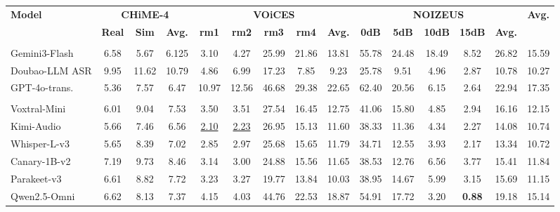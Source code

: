 \documentclass{llmxive}
\providecommand{\arraystretch}{1.05}
\begin{document}
\begin{table}[t]
\centering
\footnotesize
\renewcommand{\arraystretch}{1.0}
\vspace{-2mm}
\label{tab:main_noise}

\setlength{\tabcolsep}{2.73pt}
\begin{tabular}{lcccccccccccccc}
\toprule
\multirow{2}{*}{\textbf{Model}} &
\multicolumn{3}{c}{\textbf{CHiME-4}} &
\multicolumn{5}{c}{\textbf{VOiCES}} &
\multicolumn{5}{c}{\textbf{NOIZEUS}} &
\multirow{2}{*}{\textbf{Avg.}} \\
\cmidrule(lr){2-4}
\cmidrule(lr){5-9}
\cmidrule(lr){10-14}
&
\textbf{Real} &
\textbf{Sim} &
\textbf{Avg.} &
\textbf{rm1} &
\textbf{rm2} &
\textbf{rm3} &
\textbf{rm4} &
\textbf{Avg.} &
\textbf{0dB} &
\textbf{5dB} &
\textbf{10dB} &
\textbf{15dB} &
\textbf{Avg.} &
\\
\midrule
\rowcolor{headerblue}
\multicolumn{15}{l}{\textit{Closed-source models}} \\
Gemini3-Flash &
6.58 &
5.67 &
6.125 &
3.10 &
4.27 &
25.99 &
21.86 &
13.81 &
55.78 &
24.48 &
18.49 &
8.52 &
26.82 &
15.59 \\
Doubao-LLM ASR &
9.95 &
11.62 &
10.79 &
4.86 &
6.99 &
17.23 &
7.85 &
9.23 &
25.78 &
9.51 &
4.96 &
2.87 &
10.78 &
10.27 \\
GPT-4o-trans. &
5.36 &
7.57 &
6.47 &
10.97 &
12.56 &
46.68 &
29.38 &
22.65 &
62.40 &
20.56 &
6.15 &
2.64 &
22.94 &
17.35 \\
\rowcolor{headerblue}
\multicolumn{15}{l}{\textit{Open-source models}} \\
Voxtral-Mini &
6.01 &
9.04 &
7.53 &
3.50 &
3.51 &
27.54 &
16.45 &
12.75 &
41.06 &
15.80 &
4.85 &
2.94 &
16.16 &
12.15 \\
Kimi-Audio &
5.66 &
7.46 &
6.56 &
\underline{2.10} &
\underline{2.23} &
26.95 &
15.13 &
11.60 &
38.33 &
11.36 &
4.34 &
2.27 &
14.08 &
10.74 \\
Whisper-L-v3 &
5.65 &
8.39 &
7.02 &
2.85 &
2.97 &
25.68 &
15.65 &
11.79 &
34.71 &
12.55 &
3.93 &
2.17 &
13.34 &
10.72 \\
Canary-1B-v2 &
7.19 &
9.73 &
8.46 &
3.14 &
3.00 &
24.88 &
15.56 &
11.65 &
38.53 &
12.76 &
6.56 &
3.77 &
15.41 &
11.84 \\
Parakeet-v3 &
6.61 &
8.82 &
7.72 &
3.23 &
3.27 &
19.77 &
13.84 &
10.03 &
38.95 &
14.67 &
5.99 &
3.15 &
15.69 &
11.15 \\
Qwen2.5-Omni &
6.62 &
8.13 &
7.37 &
4.15 &
4.03 &
44.76 &
22.53 &
18.87 &
54.91 &
17.72 &
3.20 &
\textbf{0.88} &
19.18 &
15.14 \\

\end{tabular}
\end{table}
\end{document}
